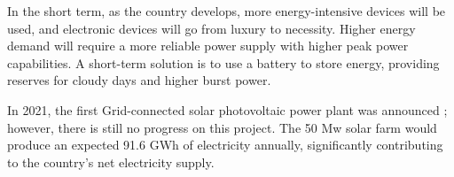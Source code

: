 In the short term, as the country develops, more energy-intensive devices will be used, and electronic devices will go from luxury to necessity. Higher energy demand will require a more reliable power supply with higher peak power capabilities. A short-term solution is to use a battery to store energy, providing reserves for cloudy days and higher burst power.


In 2021, the first Grid-connected solar photovoltaic power plant was announced \cite{solarfar}; however, there is still no progress on this project. The 50 Mw solar farm would produce an expected 91.6 GWh of electricity annually, significantly contributing to the country's net electricity supply.